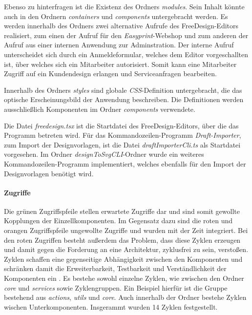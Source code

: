 Ebenso zu hinterfragen ist die Existenz des Ordners \emph{modules}. Sein Inhalt könnte auch in den Ordnern \emph{containers} und  \emph{components} untergebracht werden. Es werden innerhalb des Ordners zwei alternative Aufrufe des FreeDesign-Editors realisiert, zum einen der Aufruf für den \emph{Easyprint}-Webshop und zum anderen der Aufruf aus einer internen Anwendung zur Adminstration. Der interne Aufruf unterscheidet sich durch ein Anmeldeformular, welches dem Editor vorgeschallten ist, über welches sich ein Mitarbeiter autorisiert. Somit kann eine Mitarbeiter Zugriff auf ein Kundendesign erlangen und Serviceanfragen bearbeiten. 

Innerhalb des Ordners \emph{styles} sind globale \emph{CSS}-Definition untergebracht, die das optische Erscheinungsbild der Anwendung beschreiben. Die Definitionen werden ausschließlich Komponenten im Ordner \emph{components} verwendete. 


Die Datei \emph{freedesign.tsx} ist die Startdatei des FreeDesign-Editors, über die das Programm betreten wird. Für das Kommandozeilen-Programm \emph{Draft-Importer}, zum Import der Designvorlagen, ist die Datei \emph{draftImporterCli.ts} als Startdatei vorgesehen. Im Ordner \emph{designToSvgCLI}-Ordner wurde ein weiteres Kommandozeilen-Programm implementiert, welches ebenfalls für den Import der Designvorlagen benötigt wird.


\paragraph{Zugriffe}
Die grünen Zugriffspfeile stellen erwartete Zugriffe dar und sind somit gewollte Kopplungen der Einzellkomponenten. Im Gegensatz dazu sind die roten und orangen Zugriffspfeile ungewollte Zugriffe und wurden mit der Zeit integriert. Bei den roten Zugriffen besteht außerdem das Problem, dass diese Zyklen erzeugen und damit gegen die Forderung an eine Architektur, zyklusfrei zu sein, verstoßen. Zyklen schaffen eine gegenseitige Abhängigkeit zwischen den Komponenten und schränken damit die Erweiterbarkeit, Testbarkeit und Verständlichkeit der Komponenten ein \autocite[vgl.][88 - 90]{Lilienthal2019}. 
Es bestehe sowohl einzelne Zyklen, wie zwischen den Ordner \emph{core} und \emph{services} sowie Zyklengruppen. Ein Beispiel hierfür ist die Gruppe bestehend aus \emph{actions}, \emph{utils} und \emph{core}.
Auch innerhalb der Ordner bestehe Zyklen wischen Unterkomponenten. 
Insgerammt wurden 14 Zyklen festgestellt.


